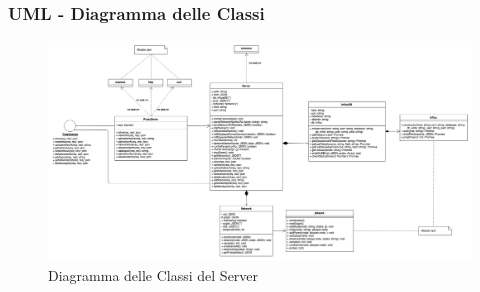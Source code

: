\begin{landscape}
\subsubsection{UML - Diagramma delle Classi}
\begin{figure}[H]
	\begin{center}
		\includegraphics[scale=0.35]{./images/serverClassi.png} 
	\end{center}
	\caption{Diagramma delle Classi del Server}
\end{figure}
\end{landscape}


